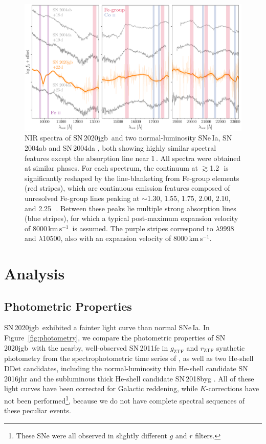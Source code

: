 \documentclass[twocolumn]{aastex631}
\newcommand{\sn}{SN\,2020jgb}
\newcommand{\kms}{$\mathrm{km}\,\mathrm{s}^{-1}$}
\begin{document}
\begin{figure}
    \centering
    \includegraphics[width=\textwidth]{NIR_spec.pdf}
    \caption{NIR spectra of \sn\ and two normal-luminosity SNe\,Ia, SN\,2004ab and SN\,2004da \citep{Marion2009_NIR}, both showing highly similar spectral features except the absorption line near 1\,\micron. All spectra were obtained at similar phases. For each spectrum, the continuum at $\gtrsim$1.2\,\micron\ is significantly reshaped by the line-blanketing from Fe-group elements (red stripes), which are continuous emission features composed of unresolved Fe-group lines peaking at $\sim$1.30, 1.55, 1.75, 2.00, 2.10, and 2.25\,\micron\ \citep{Marion2009_NIR}. Between these peaks lie multiple strong  absorption lines (blue stripes), for which a typical post-maximum expansion velocity of 8000\,\kms\ is assumed. The purple stripes correspond to  $\lambda$9998 and  $\lambda$10500, also with an expansion velocity of 8000\,\kms.}
    \label{fig:NIR_spec}
\end{figure}

\section{Analysis} \label{sec:analysis}
\subsection{Photometric Properties}
\sn\ exhibited a fainter light curve than normal SNe\,Ia. In Figure~\ref{fig:photometry}, we compare the photometric properties of \sn\ with the nearby, well-observed SN\,2011fe in $g_\mathrm{ZTF}$ and $r_\mathrm{ZTF}$ synthetic photometry from the spectrophotometric time series of \citet{Pereira_2013}, as well as two He-shell DDet candidates, including the normal-luminosity thin He-shell candidate SN\,2016jhr \citep{jiang_16jhr_2017} and the subluminous thick He-shell candidate SN\,2018byg \citep{de_18byg_2019}. All of these light curves have been corrected for Galactic reddening, while $K$-corrections have not been performed\footnote{These SNe were all observed in slightly different $g$ and $r$ filters.}, because we do not have complete spectral sequences of these peculiar events.
\end{document}
